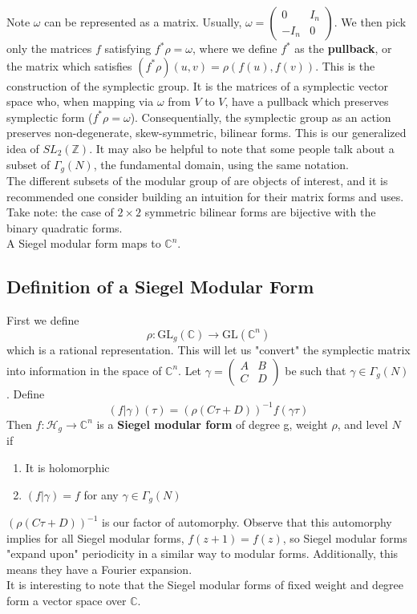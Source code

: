 \documentclass[11pt, oneside]{amsart}
\begin{document}
Note $\omega$ can be represented as a matrix. Usually, $\omega=\left( \begin{array}{cc}{0} & {I_{n}} \\ {-I_{n}} & {0}\end{array}\right)$. We then pick only the matrices $f$ satisfying $f^{*} \rho=\omega$, where we define $f^{*}$ as the \textbf{pullback}, or the matrix which satisfies $\left(f^{*} \rho\right)(u, v)=\rho(f(u), f(v))$. This is the construction of the symplectic group. It is the matrices of a symplectic vector space who, when mapping via $\omega$ from $V$ to $V$, have a pullback which preserves symplectic form ($f^{*} \rho=\omega$). Consequentially, the symplectic group as an action preserves non-degenerate, skew-symmetric, bilinear forms. This is our generalized idea of $SL_{2}(\mathbb{Z}).$ It may also be helpful to note that some people talk about a subset of $\Gamma_{g}(N)$, the fundamental domain, using the same notation.\\
The different subsets of the modular group of are objects of interest, and it is recommended one consider building an intuition for their matrix forms and uses.
Take note: the case of $2\times 2$ symmetric bilinear forms are bijective with the binary quadratic forms.\\
A Siegel modular form maps to $\mathbb{C}^{n}$.
\subsection{Definition of a Siegel Modular Form}
First we define $$\rho : \mathrm{GL}_{g}(\mathbb{C}) \rightarrow \mathrm{GL}(\mathbb{C}^{n})$$
which is a rational representation. This will let us "convert" the symplectic matrix into information in the space of $\mathbb{C}^{n}$. Let $\gamma=\left( \begin{array}{ll}{A} & {B} \\ {C} & {D}\end{array}\right)$ be such that $\gamma\in\Gamma_{g}(N)$. Define $$(f | \gamma)(\tau)=(\rho(C \tau+D))^{-1} f(\gamma \tau)$$ Then $f : \mathcal{H}_{g} \rightarrow \mathbb{C}^{n}$ is a \textbf{Siegel modular form} of degree g, weight $\rho$, and level $N$ if
\begin{enumerate}
\item It is holomorphic
\item $(f | \gamma)=f$ for any $\gamma\in\Gamma_{g}(N)$
\end{enumerate}
$(\rho(C \tau+D))^{-1}$ is our factor of automorphy. Observe that this automorphy implies for all Siegel modular forms, $f(z+1)=f(z)$, so Siegel modular forms "expand upon" periodicity in a similar way to modular forms. Additionally, this means they have a Fourier expansion.\\
It is interesting to note that the Siegel modular forms of fixed weight and degree form a vector space over $\mathbb{C}$.
\end{document}
